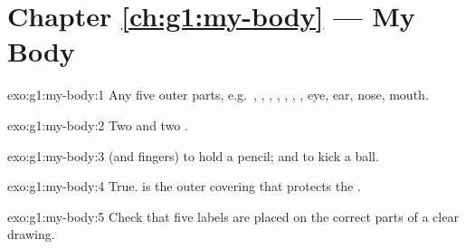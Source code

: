 \section*{Chapter \ref{ch:g1:my-body} --- My Body}

\begin{solution}{exo:g1:my-body:1}
Any five outer parts, e.g.\ , , , , , ,
, eye, ear, nose, mouth.
\end{solution}

\begin{solution}{exo:g1:my-body:2}
Two  and two .
\end{solution}

\begin{solution}{exo:g1:my-body:3}
 (and fingers) to hold a pencil;  and  to kick a ball.
\end{solution}

\begin{solution}{exo:g1:my-body:4}
True.  is the outer covering that protects the .
\end{solution}

\begin{solution}{exo:g1:my-body:5}
Check that five labels are placed on the correct parts of a clear
drawing.
\end{solution}

